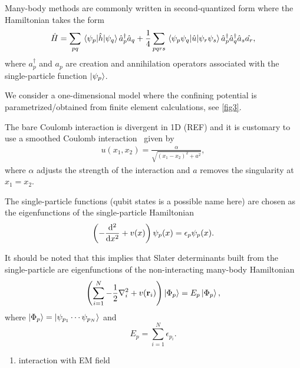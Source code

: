 \documentclass[twocolumn,superscriptaddress,unsortedaddress,
 amsmath,amssymb,
 aps,
]{revtex4-2}
\begin{document}
    Many-body methods are commonly written in second-quantized form where the Hamiltonian takes the form 
    \begin{equation}
        \hat{H} = \sum_{pq} \mel{\psi_p}{\hat{h}}{\psi_q}\hat{a}_p^\dagger \hat{a}_q + \frac{1}{4}\sum_{pqrs} \mel{\psi_p \psi_q}{\hat{u}}{\psi_r \psi_s} \hat{a}_p^\dagger \hat{a}_q^\dagger \hat{a}_s \hat{a_r},
    \end{equation}
    where $a_p^\dagger$ and $a_p$ are creation and annihilation operators associated with the single-particle function $\ket{\psi_p}$.
    
    We consider a one-dimensional model where the confining potential is parametrized/obtained from finite element calculations, see \ref{fig3}. 
    
    The bare Coulomb interaction is divergent in 1D (REF) and it is customary to use a smoothed Coulomb interaction~\cite{su-coulomb} given by 
    \begin{align}
        u(x_1, x_2) = \frac{\alpha}{\sqrt{(x_1 - x_2)^2 + a^2}},
    \end{align}
    where $\alpha$ adjusts the strength of the interaction and $a$ removes
    the singularity at $x_1 = x_2$.
    
    The single-particle functions (qubit states is a possible name here) are chosen as the eigenfunctions of the single-particle Hamiltonian
    \begin{equation}
        \left( -\dv[2]{}{x}+v(x) \right) \psi_p(x) = \epsilon_p \psi_p(x).
    \end{equation}
    
    It should be noted that this implies that Slater determinants built from the single-particle are eigenfunctions of the non-interacting many-body Hamiltonian
    \begin{equation}
     \left( \sum_{i=1}^N -\frac{1}{2}\laplacian_i + v(\vb{r}_i)  \right) \ket{\Phi_p} = E_p \ket{\Phi_p},
    \end{equation}
    where $\ket{\Phi_p} = \ket{\psi_{p_1}\cdots \psi_{p_N}}$ and 
    \begin{equation}
        E_p = \sum_{i=1}^N \epsilon_{p_i}.
    \end{equation}
    
    \begin{enumerate}
        \item interaction with EM field
    \end{enumerate}
    
\end{document}
